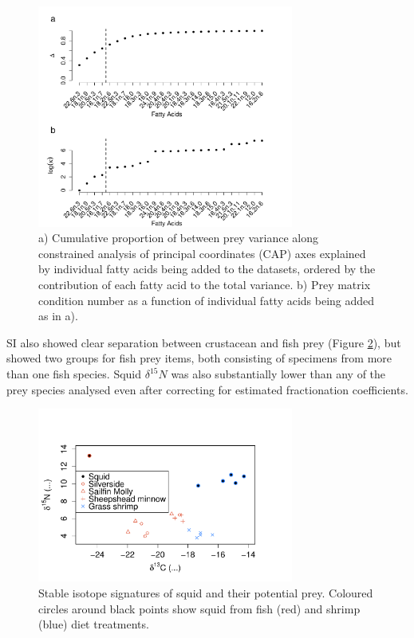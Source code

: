 \documentclass[fleqn,10pt]{wlpeerj}
\begin{document}
\begin{figure}
  \begin{center}  
      \includegraphics[width=0.75\textwidth]{figures/var_select.pdf}
      \caption{a) Cumulative proportion of between prey variance along constrained analysis of principal coordinates (CAP) axes
      explained by individual fatty acids being added to the datasets,
      ordered by the contribution of each fatty acid to the total
      variance. b) Prey matrix condition number as a function of
      individual fatty acids being added as in a).}
    \label{fig:var_select}
  \end{center}
\end{figure}

SI also showed clear separation between crustacean and fish prey (Figure \ref{fig:squid_SI}),
but showed two groups for fish prey items, both consisting of specimens
from more than one fish species. Squid $\delta^{15}N$ was also substantially lower than any
of the prey species analysed even after correcting for estimated
fractionation coefficients.

\begin{figure}
  \begin{center}   
      \includegraphics[width=0.75\textwidth]{figures/SI_plot.pdf}
       \caption{Stable isotope signatures of squid and their potential prey. Coloured circles around black points show squid from fish (red) and shrimp (blue) diet treatments.}
    \label{fig:squid_SI}
  \end{center}
\end{figure}
\end{document}
